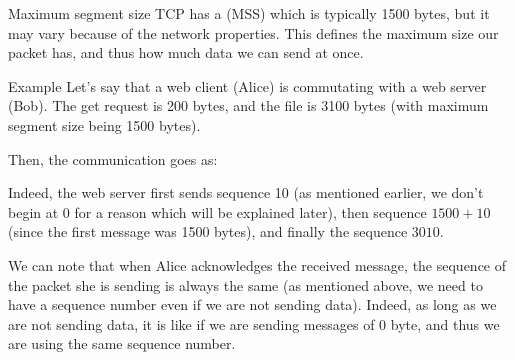 \documentclass[a4paper]{article}
\begin{document}
\begin{parag}{Maximum segment size}
    TCP has a  (MSS) which is typically 1500 bytes, but it may vary because of the network properties. This defines the maximum size our packet has, and thus how much data we can send at once.
\end{parag}

\begin{parag}{Example}
    Let's say that a web client (Alice) is commutating with a web server (Bob). The get request is 200 bytes, and the file is 3100 bytes (with maximum segment size being 1500 bytes).

    Then, the communication goes as:

    Indeed, the web server first sends sequence 10 (as mentioned earlier, we don't begin at 0 for a reason which will be explained later), then sequence $1500 + 10$ (since the first message was 1500 bytes), and finally the sequence $3010$.

    We can note that when Alice acknowledges the received message, the sequence of the packet she is sending is always the same (as mentioned above, we need to have a sequence number even if we are not sending data). Indeed, as long as we are not sending data, it is like if we are sending messages of $0$ byte, and thus we are using the same sequence number.
\end{parag}
\end{document}
